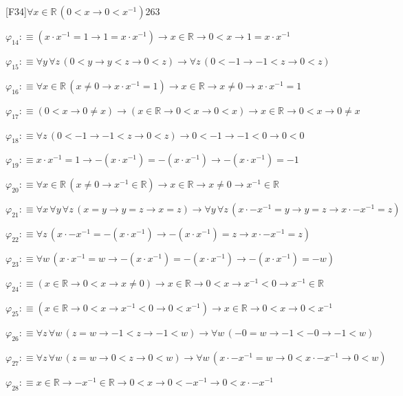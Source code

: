 \begin{fullproof}{[F34]}{$\forall x \in \mathbb{R}\,(0 < x \to 0 < x^{-1})$}{263}
\begin{abbrevlist}
\item $\varphi_{14} :\equiv (x \cdot x^{-1} = 1 \to 1 = x \cdot x^{-1}) \to x \in \mathbb{R} \to 0 < x \to 1 = x \cdot x^{-1}$
\item $\varphi_{15} :\equiv \forall y\,\forall z\,(0 < y \to y < z \to 0 < z) \to \forall z\,(0 < -1 \to -1 < z \to 0 < z)$
\item $\varphi_{16} :\equiv \forall x \in \mathbb{R}\,(x \neq 0 \to x \cdot x^{-1} = 1) \to x \in \mathbb{R} \to x \neq 0 \to x \cdot x^{-1} = 1$
\item $\varphi_{17} :\equiv (0 < x \to 0 \neq x) \to (x \in \mathbb{R} \to 0 < x \to 0 < x) \to x \in \mathbb{R} \to 0 < x \to 0 \neq x$
\item $\varphi_{18} :\equiv \forall z\,(0 < -1 \to -1 < z \to 0 < z) \to 0 < -1 \to -1 < 0 \to 0 < 0$
\item $\varphi_{19} :\equiv x \cdot x^{-1} = 1 \to -(x \cdot x^{-1}) = -(x \cdot x^{-1}) \to -(x \cdot x^{-1}) = -1$
\item $\varphi_{20} :\equiv \forall x \in \mathbb{R}\,(x \neq 0 \to x^{-1} \in \mathbb{R}) \to x \in \mathbb{R} \to x \neq 0 \to x^{-1} \in \mathbb{R}$
\item $\varphi_{21} :\equiv \forall x\,\forall y\,\forall z\,(x = y \to y = z \to x = z) \to \forall y\,\forall z\,(x \cdot -x^{-1} = y \to y = z \to x \cdot -x^{-1} = z)$
\item $\varphi_{22} :\equiv \forall z\,(x \cdot -x^{-1} = -(x \cdot x^{-1}) \to -(x \cdot x^{-1}) = z \to x \cdot -x^{-1} = z)$
\item $\varphi_{23} :\equiv \forall w\,(x \cdot x^{-1} = w \to -(x \cdot x^{-1}) = -(x \cdot x^{-1}) \to -(x \cdot x^{-1}) = -w)$
\item $\varphi_{24} :\equiv (x \in \mathbb{R} \to 0 < x \to x \neq 0) \to x \in \mathbb{R} \to 0 < x \to x^{-1} < 0 \to x^{-1} \in \mathbb{R}$
\item $\varphi_{25} :\equiv (x \in \mathbb{R} \to 0 < x \to x^{-1} < 0 \to 0 < x^{-1}) \to x \in \mathbb{R} \to 0 < x \to 0 < x^{-1}$
\item $\varphi_{26} :\equiv \forall z\,\forall w\,(z = w \to -1 < z \to -1 < w) \to \forall w\,(-0 = w \to -1 < -0 \to -1 < w)$
\item $\varphi_{27} :\equiv \forall z\,\forall w\,(z = w \to 0 < z \to 0 < w) \to \forall w\,(x \cdot -x^{-1} = w \to 0 < x \cdot -x^{-1} \to 0 < w)$
\item $\varphi_{28} :\equiv x \in \mathbb{R} \to -x^{-1} \in \mathbb{R} \to 0 < x \to 0 < -x^{-1} \to 0 < x \cdot -x^{-1}$

\end{abbrevlist}
\end{fullproof}
